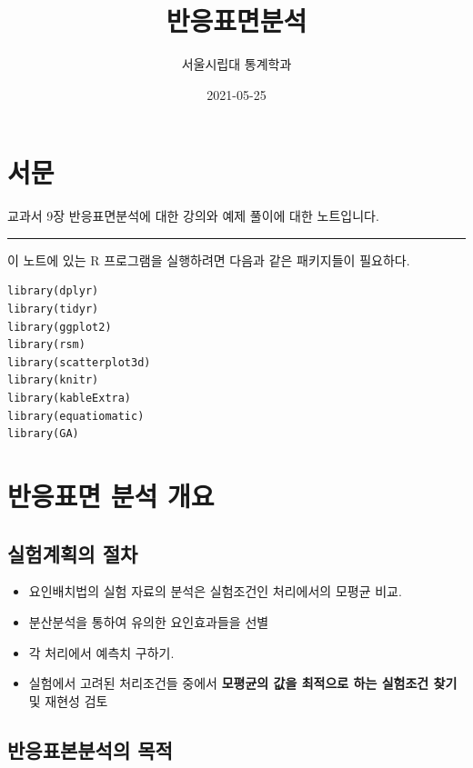\documentclass[
]{book}
\title{반응표면분석}
\author{서울시립대 통계학과}
\date{2021-05-25}
\theoremstyle{definition}
\theoremstyle{definition}
\theoremstyle{definition}
\theoremstyle{definition}
\theoremstyle{remark}
\begin{document}
\maketitle

{
\setcounter{tocdepth}{1}
\tableofcontents
}
\hypertarget{uxc11cuxbb38}{%
\chapter*{서문}\label{uxc11cuxbb38}}


교과서 9장 반응표면분석에 대한 강의와 예제 풀이에 대한 노트입니다.

\begin{center}\rule{0.5\linewidth}{0.5pt}\end{center}

이 노트에 있는 R 프로그램을 실행하려면 다음과 같은 패키지들이 필요하다.

\begin{verbatim}
library(dplyr)
library(tidyr)
library(ggplot2)
library(rsm)
library(scatterplot3d)
library(knitr)
library(kableExtra)
library(equatiomatic)
library(GA)
\end{verbatim}

\mainmatter

\hypertarget{responseintro}{%
\chapter{반응표면 분석 개요}\label{responseintro}}

\hypertarget{uxc2e4uxd5d8uxacc4uxd68duxc758-uxc808uxcc28}{%
\section{실험계획의 절차}\label{uxc2e4uxd5d8uxacc4uxd68duxc758-uxc808uxcc28}}

\begin{itemize}
\item
  요인배치법의 실험 자료의 분석은 실험조건인 처리에서의 모평균 비교.
\item
  분산분석을 통하여 유의한 요인효과들을 선별
\item
  각 처리에서 예측치 구하기.
\item
  실험에서 고려된 처리조건들 중에서 \textbf{모평균의 값을 최적으로 하는 실험조건 찾기} 및 재현성 검토
\end{itemize}

\hypertarget{uxbc18uxc751uxd45cuxbcf8uxbd84uxc11duxc758-uxbaa9uxc801}{%
\section{반응표본분석의 목적}\label{uxbc18uxc751uxd45cuxbcf8uxbd84uxc11duxc758-uxbaa9uxc801}}
\end{document}
